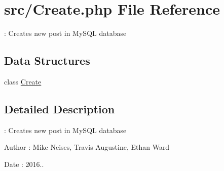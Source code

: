 \hypertarget{_create_8php}{}\section{src/\+Create.php File Reference}
\label{_create_8php}


\+: Creates new post in My\+S\+QL database  


\subsection*{Data Structures}
\begin{DoxyCompactItemize}
\item 
class \hyperlink{class_create}{Create}
\end{DoxyCompactItemize}


\subsection{Detailed Description}
\+: Creates new post in My\+S\+QL database 

\begin{DoxyAuthor}{Author}
\+: Mike Neises, Travis Augustine, Ethan Ward 
\end{DoxyAuthor}
\begin{DoxyDate}{Date}
\+: 2016.. 
\end{DoxyDate}
